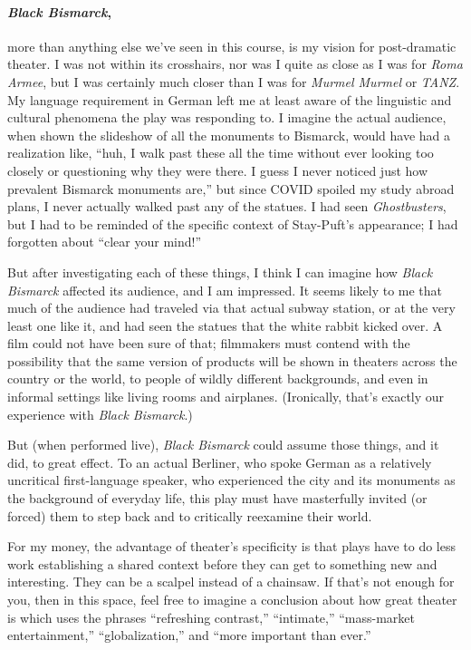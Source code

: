 \clearpage{}

\paragraph{\textit{Black Bismarck},} more than anything else we've seen in this course, is
my vision for post-dramatic theater. I was not within its crosshairs, nor was I quite as
close as I was for \textit{Roma Armee}, but I was certainly much closer than I was for
\textit{Murmel Murmel} or \textit{TANZ}. My language requirement in German left me at
least aware of the linguistic and cultural phenomena the play was responding to.  I
imagine the actual audience, when shown the slideshow of all the monuments to Bismarck,
would have had a realization like, \enquote{huh, I walk past these all the time without
  ever looking too closely or questioning why they were there. I guess I never noticed
  just how prevalent Bismarck monuments are,} but since COVID spoiled my study abroad
plans, I never actually walked past any of the statues. I had seen \textit{Ghostbusters},
but I had to be reminded of the specific context of Stay-Puft's appearance; I had
forgotten about \enquote{clear your mind!}

But after investigating each of these things, I think I can imagine how \textit{Black
  Bismarck} affected its audience, and I am impressed. It seems likely to me that much of
the audience had traveled via that actual subway station, or at the very least one like
it, and had seen the statues that the white rabbit kicked over. A film could not have been
sure of that; filmmakers must contend with the possibility that the same version of
products will be shown in theaters across the country or the world, to people of wildly
different backgrounds, and even in informal settings like living rooms and
airplanes. (Ironically, that's exactly our experience with \textit{Black Bismarck}.)

But (when performed live), \textit{Black Bismarck} could assume those things, and it did,
to great effect. To an actual Berliner, who spoke German as a relatively uncritical
first-language speaker, who experienced the city and its monuments as the background of
everyday life, this play must have masterfully invited (or forced) them to step back and
to critically reexamine their world.

\clearpage{}

For my money, the advantage of theater's specificity is that plays have to do less work
establishing a shared context before they can get to something new and interesting. They
can be a scalpel instead of a chainsaw. If that's not enough for you, then in this space,
feel free to imagine a conclusion about how great theater is which uses the phrases
\enquote{refreshing contrast,} \enquote{intimate,} \enquote{mass-market entertainment,}
\enquote{globalization,} and \enquote{more important than ever.}
